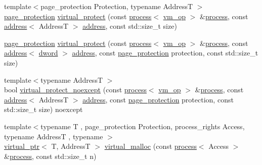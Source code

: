 \begin{DoxyCompactItemize}
\item 
{\footnotesize template$<$page\+\_\+protection Protection, typename AddressT $>$ }\\\mbox{\hyperlink{structdistant_1_1access__rights_a09c6caea8f570f8e2d18c3ef2e2a7804}{page\+\_\+protection}} \mbox{\hyperlink{namespacedistant_1_1memory_a66c503d49f2bda7d569060ef957fc763}{virtual\+\_\+protect}} (const \mbox{\hyperlink{classdistant_1_1kernel__objects_1_1process}{process}}$<$ \mbox{\hyperlink{namespacedistant_af02d4223cd2f509cc373ac9d83655f19}{vm\+\_\+op}} $>$ \&\mbox{\hyperlink{classdistant_1_1kernel__objects_1_1process}{process}}, const \mbox{\hyperlink{classdistant_1_1memory_1_1address}{address}}$<$ AddressT $>$ \mbox{\hyperlink{classdistant_1_1memory_1_1address}{address}}, const std\+::size\+\_\+t size)
\item 
\mbox{\hyperlink{structdistant_1_1access__rights_a09c6caea8f570f8e2d18c3ef2e2a7804}{page\+\_\+protection}} \mbox{\hyperlink{namespacedistant_1_1memory_a1d52e5f62c1914f97b4e08a653e9b6fb}{virtual\+\_\+protect}} (const \mbox{\hyperlink{classdistant_1_1kernel__objects_1_1process}{process}}$<$ \mbox{\hyperlink{namespacedistant_af02d4223cd2f509cc373ac9d83655f19}{vm\+\_\+op}} $>$ \&\mbox{\hyperlink{classdistant_1_1kernel__objects_1_1process}{process}}, const \mbox{\hyperlink{classdistant_1_1memory_1_1address}{address}}$<$ \mbox{\hyperlink{namespacedistant_a9fa41a5a1a17dcbd24da1c1855c92489}{dword}} $>$ \mbox{\hyperlink{classdistant_1_1memory_1_1address}{address}}, const \mbox{\hyperlink{structdistant_1_1access__rights_a09c6caea8f570f8e2d18c3ef2e2a7804}{page\+\_\+protection}} protection, const std\+::size\+\_\+t size)
\item 
{\footnotesize template$<$typename AddressT $>$ }\\bool \mbox{\hyperlink{namespacedistant_1_1memory_a3819d0b0d2faf36f55bb8221618f6fc0}{virtual\+\_\+protect\+\_\+noexcept}} (const \mbox{\hyperlink{classdistant_1_1kernel__objects_1_1process}{process}}$<$ \mbox{\hyperlink{namespacedistant_af02d4223cd2f509cc373ac9d83655f19}{vm\+\_\+op}} $>$ \&\mbox{\hyperlink{classdistant_1_1kernel__objects_1_1process}{process}}, const \mbox{\hyperlink{classdistant_1_1memory_1_1address}{address}}$<$ AddressT $>$ \mbox{\hyperlink{classdistant_1_1memory_1_1address}{address}}, const \mbox{\hyperlink{structdistant_1_1access__rights_a09c6caea8f570f8e2d18c3ef2e2a7804}{page\+\_\+protection}} protection, const std\+::size\+\_\+t size) noexcept
\item 
{\footnotesize template$<$typename T , page\+\_\+protection Protection, process\+\_\+rights Access, typename AddressT , typename $>$ }\\\mbox{\hyperlink{classdistant_1_1memory_1_1virtual__ptr}{virtual\+\_\+ptr}}$<$ T, AddressT $>$ \mbox{\hyperlink{namespacedistant_1_1memory_a4c70496966478cc4190de831ac4534ec}{virtual\+\_\+malloc}} (const \mbox{\hyperlink{classdistant_1_1kernel__objects_1_1process}{process}}$<$ Access $>$ \&\mbox{\hyperlink{classdistant_1_1kernel__objects_1_1process}{process}}, const std\+::size\+\_\+t n)

\end{DoxyCompactItemize}
